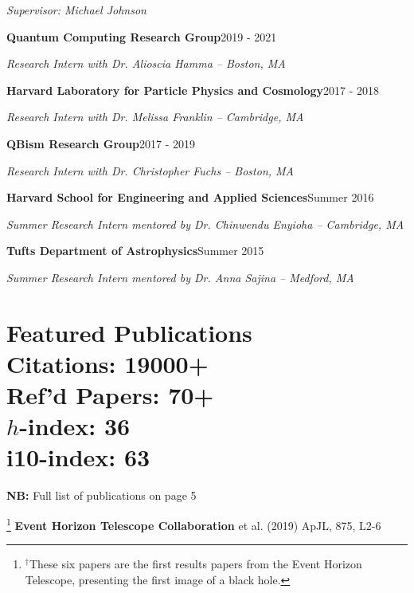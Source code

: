 \documentclass[margin,line]{res}
\begin{document}
\begin{resume}
\begin{changemargin}{-0.0cm}{2.5cm}
\textit{Supervisor: Michael Johnson}
\end{changemargin}

{\bf Quantum Computing Research Group}\hfill 2019 - 2021

\vspace{-.4cm}
{\em Research Intern with Dr. Alioscia Hamma  -- Boston, MA}

\vspace{.1cm}
{\bf Harvard Laboratory for Particle Physics and Cosmology}\hfill 2017 - 2018

\vspace{-.4cm}
{\em Research Intern with Dr. Melissa Franklin -- Cambridge, MA}

% 
{\bf QBism Research Group}\hfill 2017 - 2019

\vspace{-.4cm}
{\em Research Intern with Dr. Christopher Fuchs  -- Boston, MA}

{\bf Harvard School for Engineering and Applied Sciences}\hfill Summer 2016

\vspace{-.4cm}
{\em Summer Research Intern mentored by Dr. Chinwendu Enyioha -- Cambridge, MA}

{\bf Tufts Department of Astrophysics}\hfill Summer 2015

\vspace{-.4cm}
{\em Summer Research Intern mentored by Dr. Anna Sajina -- Medford, MA}




\vspace{+.4cm}
\section{{\sc Featured Publications  \\ \vspace{0.3cm} {\footnotesize Citations: 19000+ \\ \vspace{0.1cm} \noindent Ref'd Papers: 70+ \vspace{0.1cm} \\ $h$-index: 36 \\ i10-index: 63}} \\ }

\textbf{NB:} Full list of publications on page 5


\footnote[$\dagger$]{\noindent $^\dagger$These six papers are the first results papers from the Event Horizon Telescope, presenting the first image of a black hole.}
\textbf{Event Horizon Telescope Collaboration} et al. (2019) ApJL, 875, L2-6




\end{resume}
\end{document}
